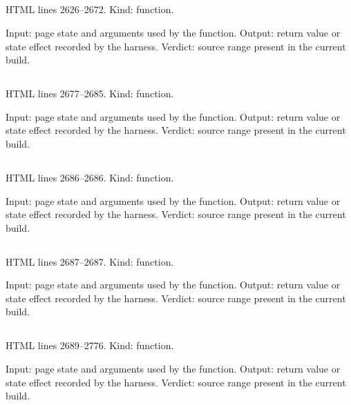 \subsection*{\texttt{}}
\label{vf_75_decodeRelQuant}
HTML lines 2626--2672. Kind: function.

Input: page state and arguments used by the function.
Output: return value or state effect recorded by the harness.
Verdict: source range present in the current build.

\subsection*{\texttt{}}
\label{vf_76_ownedBy}
HTML lines 2677--2685. Kind: function.

Input: page state and arguments used by the function.
Output: return value or state effect recorded by the harness.
Verdict: source range present in the current build.

\subsection*{\texttt{}}
\label{vf_77_ownQueryAll}
HTML lines 2686--2686. Kind: function.

Input: page state and arguments used by the function.
Output: return value or state effect recorded by the harness.
Verdict: source range present in the current build.

\subsection*{\texttt{}}
\label{vf_78_ownQuery}
HTML lines 2687--2687. Kind: function.

Input: page state and arguments used by the function.
Output: return value or state effect recorded by the harness.
Verdict: source range present in the current build.

\subsection*{\texttt{}}
\label{vf_79_decodeAnalyses}
HTML lines 2689--2776. Kind: function.

Input: page state and arguments used by the function.
Output: return value or state effect recorded by the harness.
Verdict: source range present in the current build.

